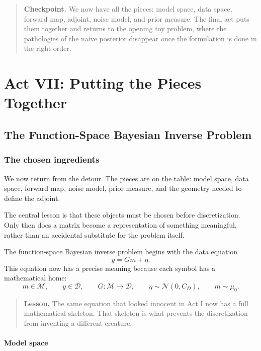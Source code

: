 \documentclass[11pt,a4paper]{book}
\newenvironment{lesson}
  {\begin{quote}\textbf{Lesson.}}
  {\end{quote}}
\newenvironment{checkpoint}
  {\begin{quote}\textbf{Checkpoint.}}
  {\end{quote}}
\newcommand{\M}{\mathcal{M}}      %
\newcommand{\D}{\mathcal{D}}      %
\newcommand{\prior}{\mu_0}
\newcommand{\noise}{\eta}
\newcommand{\obs}{y}
\newcommand{\G}{G}
\begin{document}
\begin{checkpoint}
We now have all the pieces: model space, data space, forward map, adjoint,
noise model, and prior measure. The final act puts them together and returns to
the opening toy problem, where the pathologies of the naive posterior disappear
once the formulation is done in the right order.
\end{checkpoint}

\part{Act VII: Putting the Pieces Together}

\chapter{The Function-Space Bayesian Inverse Problem}

\section{The chosen ingredients}

We now return from the detour. The pieces are on the table: model space, data
space, forward map, noise model, prior measure, and the geometry needed to
define the adjoint.

The central lesson is that these objects must be chosen before discretization.
Only then does a matrix become a representation of something meaningful, rather
than an accidental substitute for the problem itself.

The function-space Bayesian inverse problem begins with the data equation
\[
    \obs = \G m + \noise.
\]
This equation now has a precise meaning because each symbol has a mathematical
home:
\[
    m\in\M,
    \qquad
    \obs\in\D,
    \qquad
    \G:\M\to\D,
    \qquad
    \noise\sim\mathcal{N}(0,C_D),
    \qquad
    m\sim\prior.
\]

\begin{lesson}
The same equation that looked innocent in Act I now has a full mathematical
skeleton. That skeleton is what prevents the discretization from inventing a
different creature.
\end{lesson}

\subsection{Model space}
\end{document}
